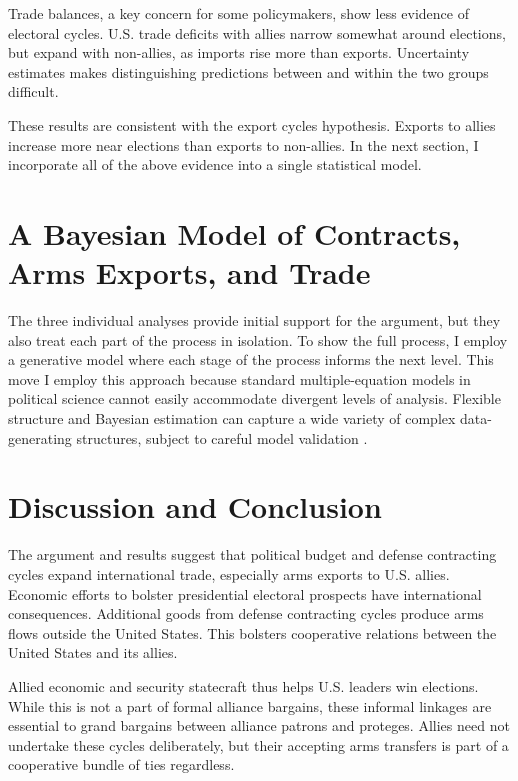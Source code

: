 \documentclass[12pt]{article}
\begin{document}
Trade balances, a key concern for some policymakers, show less evidence of electoral cycles. 
U.S. trade deficits with allies narrow somewhat around elections, but expand with non-allies, as imports rise more than exports. 
Uncertainty estimates makes distinguishing predictions between and within the two groups difficult.


These results are consistent with the export cycles hypothesis. 
Exports to allies increase more near elections than exports to non-allies.
In the next section, I incorporate all of the above evidence into a single statistical model. 



\section{A Bayesian Model of Contracts, Arms Exports, and Trade}


The three individual analyses provide initial support for the argument, but they also treat each part of the process in isolation. 
To show the full process, I employ a generative model where each stage of the process informs the next level.
This move 
I employ this approach because standard multiple-equation models in political science cannot easily accommodate divergent levels of analysis.
Flexible structure and Bayesian estimation can capture a wide variety of complex data-generating structures, subject to careful model validation \citep{Betancourt2021}. 





\section{Discussion and Conclusion}


The argument and results suggest that political budget and defense contracting cycles expand international trade, especially arms exports to U.S. allies. 
Economic efforts to bolster presidential electoral prospects have international consequences. 
Additional goods from defense contracting cycles produce arms flows outside the United States.
This bolsters cooperative relations between the United States and its allies.


Allied economic and security statecraft thus helps U.S. leaders win elections. 
While this is not a part of formal alliance bargains, these informal linkages are essential to grand bargains between alliance patrons and proteges.
Allies need not undertake these cycles deliberately, but their accepting arms transfers is part of a cooperative bundle of ties regardless.
\end{document}
